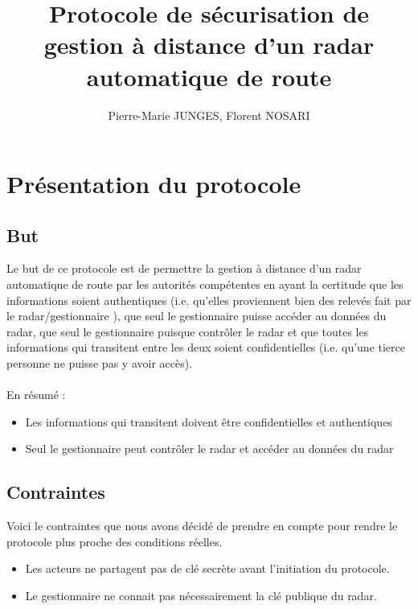\documentclass[]{scrartcl}
\title{Protocole de sécurisation de gestion à distance d'un radar automatique de route}
\author{Pierre-Marie JUNGES, Florent NOSARI}
\begin{document}
\maketitle

\begin{abstract}

\end{abstract}

\section{Présentation du protocole}

\subsection{But}

Le but de ce protocole est de permettre la gestion à distance d'un radar automatique de route par les autorités compétentes en ayant la certitude que les informations soient authentiques (i.e. qu'elles proviennent bien des relevés fait par le radar/gestionnaire ), que seul le gestionnaire puisse accéder au données du radar, que seul le gestionnaire puisque contrôler le radar et que toutes les informations qui transitent entre les deux soient confidentielles (i.e. qu'une tierce personne ne puisse pas y avoir accès).
\\
\\
En résumé :
\\
\begin{itemize}
	\item Les informations qui transitent doivent être confidentielles et authentiques
	\item Seul le gestionnaire peut contrôler le radar et accéder au données du radar
\end{itemize}

\subsection{Contraintes}

Voici le contraintes que nous avons décidé de prendre en compte pour rendre le protocole plus proche des conditions réelles.
\begin{itemize}
	\item Les acteurs ne partagent pas de clé secrète avant l'initiation du protocole.
	\item Le gestionnaire ne connait pas nécessairement la clé publique du radar.
\end{itemize}
\end{document}
